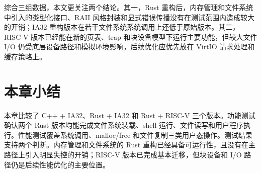 综合三组数据，本文更关注两个结论。其一，Rust 重构后，内存管理和文件系统中引入的类型化接口、RAII 风格封装和显式错误传播没有在测试范围内造成较大的开销；IA32 重构版本在若干文件系统系统调用上还低于原始版本。其二，RISC-V 版本已经能在新的页表、trap 和块设备模型下运行主要功能，但较大文件 I/O 仍受底层设备路径和模拟环境影响，后续优化应优先放在 VirtIO 请求处理和缓存策略上。

\section{本章小结}

本章比较了 C++ + IA32、Rust + IA32 和 Rust + RISC-V 三个版本。功能测试确认两个 Rust 版本均能完成文件系统装载、shell 运行、文件读写和用户程序执行。性能测试覆盖系统调用、malloc/free 和文件复制三类用户态操作。测试结果支持两个判断。内存管理和文件系统的 Rust 重构已经具备可运行性，且没有在主路径上引入明显失控的开销；RISC-V 版本已完成基本迁移，但块设备和 I/O 路径仍是后续性能优化的主要位置。
